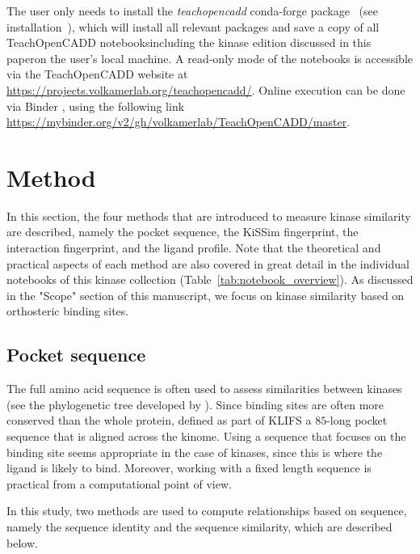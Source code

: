 \documentclass[9pt,training,ASAPversion]{livecoms}
\begin{document}
The user only needs to install the \textit{teachopencadd} conda-forge package~\cite{toc_conda_forge_2022} (see installation~\cite{toc_website_installing}), which will install all relevant packages and save a copy of all TeachOpenCADD notebooks\textemdash including the kinase edition discussed in this paper\textemdash on the user's local machine. A read-only mode of the notebooks is accessible via the TeachOpenCADD website at \href{https://projects.volkamerlab.org/teachopencadd/}{https://projects.volkamerlab.org/teachopencadd/}. Online execution can be done via Binder \cite{binder_2018}, using the following link \url{https://mybinder.org/v2/gh/volkamerlab/TeachOpenCADD/master}.

\section{Method}
\label{sec:method}
In this section, the four methods that are introduced to measure kinase similarity are described, namely the pocket sequence, the KiSSim fingerprint, the interaction fingerprint, and the ligand profile. Note that the theoretical and practical aspects of each method are also covered in great detail in the individual notebooks of this kinase collection (Table~\ref{tab:notebook_overview}). As discussed in the "Scope" section of this manuscript, we focus on kinase similarity based on orthosteric binding sites.

\subsection{Pocket sequence}
The full amino acid sequence is often used to assess similarities between kinases (see the phylogenetic tree developed by \citet{Manning_2022_science}). Since binding sites are often more conserved than the whole protein, \citet{van_Linden_2013_JMedChem} defined as part of KLIFS a $85$-long pocket sequence that is aligned across the kinome. Using a sequence that focuses on the binding site seems appropriate in the case of kinases, since this is where the ligand is likely to bind. Moreover, working with a fixed length sequence is practical from a computational point of view. 

In this study, two methods are used to compute relationships based on sequence, namely the sequence identity and the sequence similarity, which are described below. 
\end{document}

